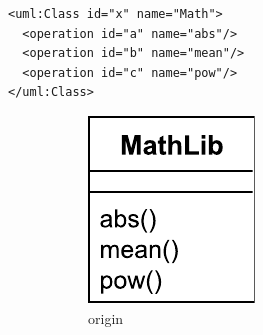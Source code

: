 \documentclass{llncs}
\begin{document}
\begin{minipage}[t]{0.59\linewidth} 
\centering
\begin{lstlisting}[style=eol,caption={The simplified XMI of the model in Fig. \ref{fig:origin}.},label=lst:originxmi]
<uml:Class id="x" name="Math">
  <operation id="a" name="abs"/>
  <operation id="b" name="mean"/>
  <operation id="c" name="pow"/>
</uml:Class>
\end{lstlisting}
\vspace{-25pt}
\begin{figure}[H]
\centering    
\hfill
\begin{subfigure}[t]{0.2\linewidth}
    \centering
    \includegraphics[width=\linewidth]{images/OriginalClassDiagram}
    \caption{origin}
    \label{fig:origin}
\end{subfigure}
\hfill
\begin{subfigure}[t]{0.2\linewidth}
    \centering

\end{subfigure}
\end{figure}
\end{minipage}
\end{document}
